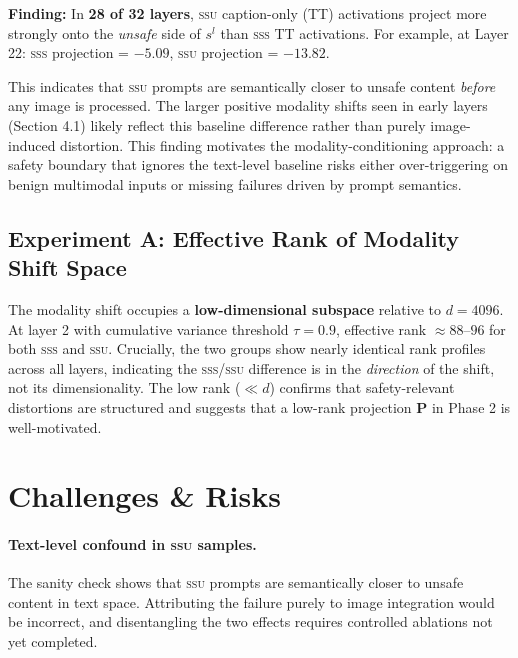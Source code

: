 \documentclass{article}
\newcommand{\safel}{s^l}
\begin{document}
\textbf{Finding:} In \textbf{28 of 32 layers}, \textsc{ssu} caption-only (TT) activations
project more strongly onto the \emph{unsafe} side of $\safel$ than \textsc{sss} TT activations.
For example, at Layer 22: \textsc{sss} projection = $-5.09$, \textsc{ssu} projection =
$-13.82$.

This indicates that \textsc{ssu} prompts are semantically closer to unsafe content
\emph{before} any image is processed.
The larger positive modality shifts seen in early layers (Section 4.1) likely reflect this
baseline difference rather than purely image-induced distortion.
This finding motivates the modality-conditioning approach: a safety boundary that ignores
the text-level baseline risks either over-triggering on benign multimodal inputs or
missing failures driven by prompt semantics.

\subsection{Experiment A: Effective Rank of Modality Shift Space}

The modality shift occupies a \textbf{low-dimensional subspace} relative to $d = 4096$.
At layer 2 with cumulative variance threshold $\tau = 0.9$, effective rank $\approx 88$--$96$
for both \textsc{sss} and \textsc{ssu}.
Crucially, the two groups show nearly identical rank profiles across all layers, indicating
the \textsc{sss}/\textsc{ssu} difference is in the \emph{direction} of the shift, not its
dimensionality.
The low rank ($\ll d$) confirms that safety-relevant distortions are structured and suggests
that a low-rank projection $\mathbf{P}$ in Phase 2 is well-motivated.

\section{Challenges \& Risks}

\paragraph{Text-level confound in \textsc{ssu} samples.}
The sanity check shows that \textsc{ssu} prompts are semantically closer to unsafe content
in text space.
Attributing the failure purely to image integration would be incorrect, and
disentangling the two effects requires controlled ablations not yet completed.
\end{document}
